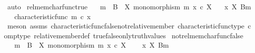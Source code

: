 \begin{isabellebody}
\ auto\isanewline
{}\isamarkupfalse%
%
\endisatagproof
{\isafoldproof}%
%
\isadelimproof
\isanewline
%
\endisadelimproof
\isanewline
{}\isamarkupfalse%
\ rel{\isacharunderscore}{\kern0pt}mem{\isacharunderscore}{\kern0pt}char{\isacharunderscore}{\kern0pt}func{\isacharunderscore}{\kern0pt}true{\isacharcolon}{\kern0pt}\isanewline
\ \ \ {\isachardoublequoteopen}m\ {\isacharcolon}{\kern0pt}\ B\ {\isasymrightarrow}\ X{\isachardoublequoteclose}\ {\isachardoublequoteopen}monomorphism\ m{\isachardoublequoteclose}\ {\isachardoublequoteopen}x\ {\isasymin}\isactrlsub c\ X{\isachardoublequoteclose}\isanewline
\ \ \ {\isachardoublequoteopen}x\ {\isasymin}\isactrlbsub X\isactrlesub \ {\isacharparenleft}{\kern0pt}B{\isacharcomma}{\kern0pt}m{\isacharparenright}{\kern0pt}{\isachardoublequoteclose}\isanewline
\ \ \ {\isachardoublequoteopen}characteristic{\isacharunderscore}{\kern0pt}func\ m\ {\isasymcirc}\isactrlsub c\ x\ {\isacharequal}{\kern0pt}\ {\isasymt}{\isachardoublequoteclose}\isanewline
%
\isadelimproof
\ \ %
\endisadelimproof
%
\isatagproof
{}\isamarkupfalse%
\ {\isacharparenleft}{\kern0pt}meson\ assms{\isacharparenleft}{\kern0pt}{}{\isacharparenright}{\kern0pt}\ characteristic{\isacharunderscore}{\kern0pt}func{\isacharunderscore}{\kern0pt}false{\isacharunderscore}{\kern0pt}not{\isacharunderscore}{\kern0pt}relative{\isacharunderscore}{\kern0pt}member\ characteristic{\isacharunderscore}{\kern0pt}func{\isacharunderscore}{\kern0pt}type\ comp{\isacharunderscore}{\kern0pt}type\ relative{\isacharunderscore}{\kern0pt}member{\isacharunderscore}{\kern0pt}def{}\ true{\isacharunderscore}{\kern0pt}false{\isacharunderscore}{\kern0pt}only{\isacharunderscore}{\kern0pt}truth{\isacharunderscore}{\kern0pt}values{\isacharparenright}{\kern0pt}%
\endisatagproof
{\isafoldproof}%
%
\isadelimproof
\isanewline
%
\endisadelimproof
\isanewline
{}\isamarkupfalse%
\ not{\isacharunderscore}{\kern0pt}rel{\isacharunderscore}{\kern0pt}mem{\isacharunderscore}{\kern0pt}char{\isacharunderscore}{\kern0pt}func{\isacharunderscore}{\kern0pt}false{\isacharcolon}{\kern0pt}\isanewline
\ \ \ {\isachardoublequoteopen}m\ {\isacharcolon}{\kern0pt}\ B\ {\isasymrightarrow}\ X{\isachardoublequoteclose}\ {\isachardoublequoteopen}monomorphism\ m{\isachardoublequoteclose}\ {\isachardoublequoteopen}x\ {\isasymin}\isactrlsub c\ X{\isachardoublequoteclose}\isanewline
\ \ \ {\isachardoublequoteopen}{\isasymnot}\ {\isacharparenleft}{\kern0pt}x\ {\isasymin}\isactrlbsub X\isactrlesub \ {\isacharparenleft}{\kern0pt}B{\isacharcomma}{\kern0pt}m{\isacharparenright}{\kern0pt}{\isacharparenright}{\kern0pt}{\isachardoublequoteclose}\isanewline

\end{isabellebody}
